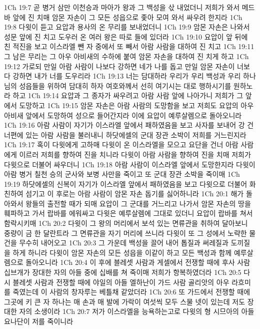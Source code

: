 1Ch 19:7  곧 병거 삼만 이천승과 마아가 왕과 그 백성을 삯 내었더니 저희가 와서 메드바 앞에 진 치매 암몬 자손이 그 모든 성읍으로 좇아 모여 와서 싸우려 한지라
1Ch 19:8  다윗이 듣고 요압과 용사의 온 무리를 보내었더니
1Ch 19:9  암몬 자손은 나와서 성문 앞에 진 치고 도우러 온 여러 왕은 따로 들에 있더라
1Ch 19:10  요압이 앞 뒤에 친 적진을 보고 이스라엘 뺀 자 중에서 또 빼서 아람 사람을 대하여 진 치고
1Ch 19:11  그 남은 무리는 그 아우 아비새의 수하에 붙여 암몬 자손을 대하여 진 치게 하고
1Ch 19:12  가로되 만일 아람 사람이 나보다 강하면 네가 나를 돕고 만일 암몬 자손이 너보다 강하면 내가 너를 도우리라
1Ch 19:13  너는 담대하라 우리가 우리 백성과 우리 하나님의 성읍들을 위하여 담대히 하자 여호와께서 선히 여기시는 대로 행하시기를 원하노라 하고
1Ch 19:14  요압과 그 종자가 싸우려고 아람 사람 앞에 나아가니 저희가 그 앞에서 도망하고
1Ch 19:15  암몬 자손은 아람 사람의 도망함을 보고 저희도 요압의 아우 아비새 앞에서 도망하여 성으로 들어간지라 이에 요압이 예루살렘으로 돌아오니라
1Ch 19:16  아람 사람이 자기가 이스라엘 앞에서 패하였음을 보고 사자를 보내어 강 건너편에 있는 아람 사람을 불러내니 하닷에셀의 군대 장관 소박이 저희를 거느린지라
1Ch 19:17  혹이 다윗에게 고하매 다윗이 온 이스라엘을 모으고 요단을 건너 아람 사람에게 이르러 저희를 향하여 진을 치니라 다윗이 아람 사람을 향하여 진을 치매 저희가 다윗으로 더불어 싸우더니
1Ch 19:18  아람 사람이 이스라엘 앞에서 도망한지라 다윗이 아람 병거 칠천 승의 군사와 보병 사만을 죽이고 또 군대 장관 소박을 죽이매
1Ch 19:19  하닷에셀의 신복이 자기가 이스라엘 앞에서 패하였음을 보고 다윗으로 더불어 화친하여 섬기고 이 후로는 아람 사람이 암몬 자손 돕기를 싫어하니라
1Ch 20:1  해가 돌아와서 왕들의 출전할 때가 되매 요압이 그 군대를 거느리고 나가서 암몬 자손의 땅을 훼파하고 가서 랍바를 에워싸고 다윗은 예루살렘에 그대로 있더니 요압이 랍바를 쳐서 함락시키매
1Ch 20:2  다윗이 그 왕의 머리에서 보석 있는 면류관을 취하여 달아보니 중량이 금 한 달란트라 그 면류관을 자기 머리에 쓰니라 다윗이 또 그 성에서 노략한 물건을 무수히 내어오고
1Ch 20:3  그 가운데 백성을 끌어 내어 톱질과 써레질과 도끼질을 하게 하니라 다윗이 암몬 자손의 모든 성읍을 이같이 하고 모든 백성과 함께 예루살렘으로 돌아오니라
1Ch 20:4  이 후에 블레셋 사람과 게셀에서 전쟁할 때에 후사 사람 십브개가 장대한 자의 아들 중에 십배를 쳐 죽이매 저희가 항복하였더라
1Ch 20:5  다시 블레셋 사람과 전쟁할 때에 야일의 아들 엘하난이 가드 사람 골리앗의 아우 라흐미를 죽였는데 이 사람의 창자루는 베틀채 같았더라
1Ch 20:6  또 가드에서 전쟁할 때에 그곳에 키 큰 자 하나는 매 손과 매 발에 가락이 여섯씩 모두 스물 넷이 있는데 저도 장대한 자의 소생이라
1Ch 20:7  저가 이스라엘을 능욕하는고로 다윗의 형 시므아의 아들 요나단이 저를 죽이니라
